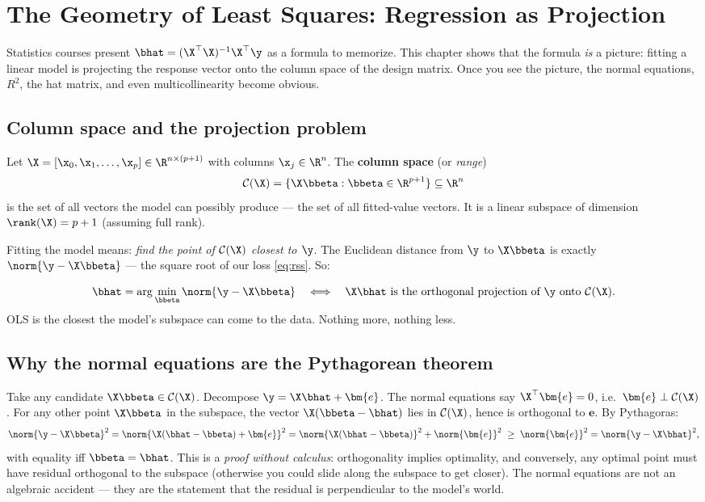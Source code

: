 \section{The Geometry of Least Squares: Regression as Projection}\label{sec:geometry}

Statistics courses present $\bhat = (\X^\top \X)^{-1} \X^\top \y$ as a formula to memorize. This chapter shows that the formula \emph{is} a picture: fitting a linear model is projecting the response vector onto the column space of the design matrix. Once you see the picture, the normal equations, $R^2$, the hat matrix, and even multicollinearity become obvious.

\subsection{Column space and the projection problem}

Let $\X = [\x_0, \x_1, \dots, \x_p] \in \R^{n \times (p+1)}$ with columns $\x_j \in \R^n$. The \textbf{column space} (or \emph{range})
\[
  \mathcal{C}(\X) = \{ \X \bbeta : \bbeta \in \R^{p+1} \} \subseteq \R^n
\]
is the set of all vectors the model can possibly produce — the set of all fitted-value vectors. It is a linear subspace of dimension $\rank(\X) = p+1$ (assuming full rank).

Fitting the model means: \emph{find the point of $\mathcal{C}(\X)$ closest to $\y$}. The Euclidean distance from $\y$ to $\X\bbeta$ is exactly $\norm{\y - \X\bbeta}$ — the square root of our loss \eqref{eq:rss}. So:

\begin{keybox}
\[
  \bhat = \arg\min_{\bbeta} \norm{\y - \X \bbeta}
  \quad\Longleftrightarrow\quad
  \X \bhat \text{ is the orthogonal projection of } \y \text{ onto } \mathcal{C}(\X).
\]
OLS is the closest the model's subspace can come to the data. Nothing more, nothing less.
\end{keybox}

\subsection{Why the normal equations are the Pythagorean theorem}

Take any candidate $\X \bbeta \in \mathcal{C}(\X)$. Decompose $\y = \X\bhat + \bm{e}$. The normal equations say $\X^\top \bm{e} = 0$, i.e.\ $\bm{e} \perp \mathcal{C}(\X)$. For any other point $\X \bbeta$ in the subspace, the vector $\X(\bbeta - \bhat)$ lies in $\mathcal{C}(\X)$, hence is orthogonal to $\bm{e}$. By Pythagoras:
\[
  \norm{\y - \X \bbeta}^2
  = \norm{\X(\bhat - \bbeta) + \bm{e}}^2
  = \norm{\X(\bhat - \bbeta)}^2 + \norm{\bm{e}}^2
  \;\geq\; \norm{\bm{e}}^2 = \norm{\y - \X \bhat}^2,
\]
with equality iff $\bbeta = \bhat$. This is a \emph{proof without calculus}: orthogonality implies optimality, and conversely, any optimal point must have residual orthogonal to the subspace (otherwise you could slide along the subspace to get closer). The normal equations are not an algebraic accident — they are the statement that the residual is perpendicular to the model's world.

